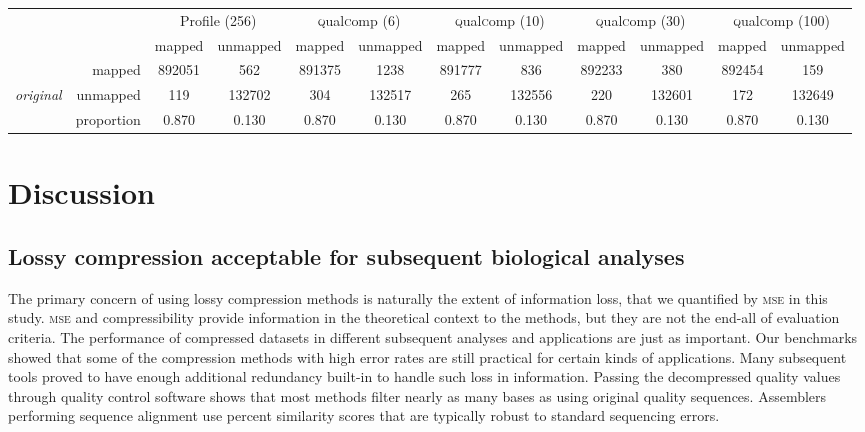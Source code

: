 \documentclass{bioinfo}
\begin{document}
\begin{table}[!tbhp]
\bigskip

\begin{tabular}{lr|cc|cc|cc|cc|cc}
&  & \multicolumn{2}{c|}{Profile (256)} & \multicolumn{2}{c|}{\textsc{q}ual\textsc{c}omp (6)} & \multicolumn{2}{c|}{\textsc{q}ual\textsc{c}omp (10)} & \multicolumn{2}{c|}{\textsc{q}ual\textsc{c}omp (30)} & \multicolumn{2}{c}{\textsc{q}ual\textsc{c}omp (100)} \\
& &  mapped & unmapped & mapped & unmapped & mapped & unmapped & mapped & unmapped & mapped & unmapped \\ 
\cline{2-12}
& mapped & 892051 & 562 & 891375 & 1238 & 891777 & 836 & 892233 & 380 & 892454 & 159 \\ 
{\em original}  & unmapped & 119 & 132702 & 304 & 132517 & 265 & 132556 & 220 & 132601 & 172 & 132649 \\ 
\cline{2-12}
& proportion & 0.870 & 0.130 & 0.870 & 0.130 & 0.870 & 0.130 & 0.870 & 0.130 & 0.870 & 0.130 \\

\end{tabular}

\label{tab:aligner}
\end{table}


\section{Discussion}

\subsection{Lossy compression acceptable for subsequent biological analyses}

The primary concern of using lossy compression methods is naturally
the extent of information loss, that we quantified by \textsc{mse} in
this study. \textsc{mse} and compressibility provide information in
the theoretical context to the methods, but they are not the end-all
of evaluation criteria. The performance of compressed datasets in
different subsequent analyses and applications are just as
important. Our benchmarks showed that some of the compression methods
with high error rates are still practical for certain kinds of
applications. Many subsequent tools proved to have enough additional
redundancy built-in to handle such loss in information. Passing the
decompressed quality values through quality control software shows
that most methods filter nearly as many bases as using original
quality sequences. Assemblers performing sequence alignment use
percent similarity scores that are typically robust to standard
sequencing errors.
\end{document}
